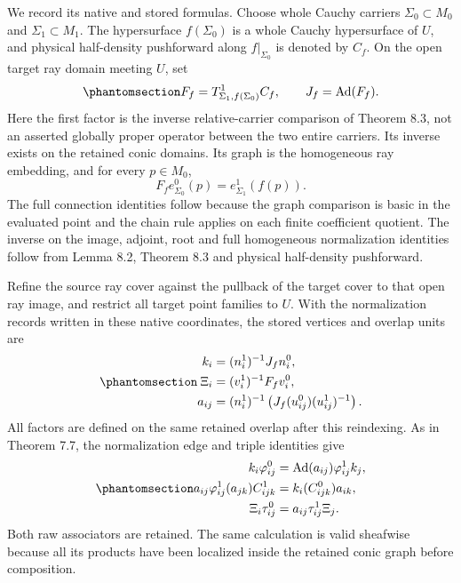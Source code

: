 \documentclass[
  english,
  11pt,
  reqno]{amsart}
\begin{document}
We record its native and stored formulas. Choose whole Cauchy carriers
\(\Sigma_0\subset M_0\) and \(\Sigma_1\subset M_1\). The hypersurface
\(f(\Sigma_0)\) is a whole Cauchy hypersurface of \(U\), and physical
half-density pushforward along \(f|_{\Sigma_0}\) is denoted by \(C_f\).
On the open target ray domain meeting \(U\), set
\begin{equation}\protect\phantomsection\label{eq:global-native-open-embedding-lift}{
F_f=T^{1}_{\Sigma_1,f(\Sigma_0)}C_f,
\qquad
J_f=\operatorname{Ad}(F_f).
}\end{equation} Here the first factor is the inverse relative-carrier
comparison of Theorem 8.3, not an asserted globally proper operator
between the two entire carriers. Its inverse exists on the retained
conic domains. Its graph is the homogeneous ray embedding, and for every
\(p\in M_0\), \[
F_f e^0_{\Sigma_0}(p)=e^1_{\Sigma_1}(f(p)).
\] The full connection identities follow because the graph comparison is
basic in the evaluated point and the chain rule applies on each finite
coefficient quotient. The inverse on the image, adjoint, root and full
homogeneous normalization identities follow from Lemma 8.2, Theorem 8.3
and physical half-density pushforward.

Refine the source ray cover against the pullback of the target cover to
that open ray image, and restrict all target point families to \(U\).
With the normalization records written in these native coordinates, the
stored vertices and overlap units are
\begin{equation}\protect\phantomsection\label{eq:global-open-stored-comparison}{
\begin{aligned}
k_i&=(n_i^1)^{-1}J_f n_i^0,\\
\Xi_i&=(v_i^1)^{-1}F_f v_i^0,\\
a_{ij}&=(n_i^1)^{-1}
\left(J_f(u_{ij}^0)(u_{ij}^1)^{-1}\right).
\end{aligned}
}\end{equation} All factors are defined on the same retained overlap
after this reindexing. As in Theorem 7.7, the normalization edge and
triple identities give
\begin{equation}\protect\phantomsection\label{eq:global-open-stored-comparison-equations}{
\begin{aligned}
k_i\varphi^0_{ij}
 &=\operatorname{Ad}(a_{ij})\varphi^1_{ij}k_j,\\
a_{ij}\varphi^1_{ij}(a_{jk})C^1_{ijk}
 &=k_i(C^0_{ijk})a_{ik},\\
\Xi_i\tau^0_{ij}
 &=a_{ij}\tau^1_{ij}\Xi_j.
\end{aligned}
}\end{equation} Both raw associators are retained. The same calculation
is valid sheafwise because all its products have been localized inside
the retained conic graph before composition.
\end{document}
